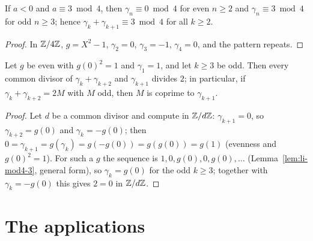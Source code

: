 \begin{lemma}
  \label{lem:li-mod4-3}
  \leanok
  If $a < 0$ and $a \equiv 3 \bmod 4$, then $\gamma_n \equiv 0 \bmod 4$ for even $n \ge 2$ and
  $\gamma_n \equiv 3 \bmod 4$ for odd $n \ge 3$; hence $\gamma_k + \gamma_{k+1} \equiv 3 \bmod 4$
  for all $k \ge 2$.
\end{lemma}
\begin{proof}
  \leanok
  In $\mathbb{Z}/4\mathbb{Z}$, $g = X^2 - 1$, $\gamma_2 = 0$, $\gamma_3 = -1$, $\gamma_4 = 0$, and the pattern
  repeats.
\end{proof}

\begin{lemma}
  \label{lem:li-cop}
  \leanok
  Let $g$ be even with $g(0)^2 = 1$ and $\gamma_1 = 1$, and let $k \ge 3$ be odd. Then every
  common divisor of $\gamma_k + \gamma_{k+2}$ and $\gamma_{k+1}$ divides $2$; in particular, if
  $\gamma_k + \gamma_{k+2} = 2M$ with $M$ odd, then $M$ is coprime to $\gamma_{k+1}$.
\end{lemma}
\begin{proof}
  \leanok
  Let $d$ be a common divisor and compute in $\mathbb{Z}/d\mathbb{Z}$: $\gamma_{k+1} = 0$, so
  $\gamma_{k+2} = g(0)$ and $\gamma_k = -g(0)$; then
  $0 = \gamma_{k+1} = g(\gamma_k) = g(-g(0)) = g(g(0)) = g(1)$ (evenness and $g(0)^2 = 1$). For
  such a $g$ the sequence is $1, 0, g(0), 0, g(0), \dots$ (Lemma~\ref{lem:li-mod4-3}, general
  form), so $\gamma_k = g(0)$ for the odd $k \ge 3$; together with $\gamma_k = -g(0)$ this gives
  $2 = 0$ in $\mathbb{Z}/d\mathbb{Z}$.
\end{proof}

\section{The applications}

